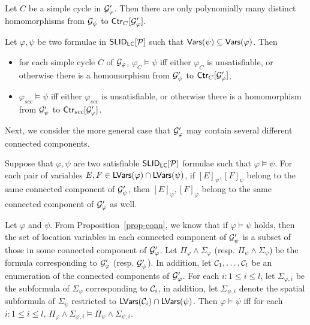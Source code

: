 \documentclass{llncs}
\begin{document}
\begin{proposition}
Let $C$ be a simple cycle in $\mathcal{G}'_\varphi$. Then there are only polynomially many distinct homomorphisms from $\mathcal{G}_\psi$ to ${\sf Ctr}_C[\mathcal{G}'_\varphi]$.
\end{proposition}


\vspace{-4mm}
\begin{lemma}\label{lem-hom}
Let $\varphi,\psi$ be two formulae in ${\sf SLID_{LC} }[\mathcal{P}]$ such that $\mathsf{Vars}(\psi) \subseteq \mathsf{Vars}(\varphi)$. Then
\vspace{-1mm}
\begin{itemize}
\item for each simple cycle $C$ of $\mathcal{G}_\varphi$, $\varphi_C \models \psi$ iff either $\varphi_C$ is unsatisfiable, or otherwise there is a homomorphism from $\mathcal{G}'_\psi$ to $ {\sf Ctr}_C[\mathcal{G}'_\varphi]$,
\item $\varphi_{scc} \models \psi$ iff either $\varphi_{scc}$ is unsatisfiable, or otherwise there is a homomorphism from $\mathcal{G}'_\psi$ to ${\sf Ctr}_{scc}[\mathcal{G}'_\varphi]$.
\end{itemize}
\end{lemma}
\vspace{-2mm}

Next, we consider the more general case that $\mathcal{G}'_\varphi$ may contain several different connected components.

\vspace{-1mm}
\begin{proposition}\label{prop-conn}
Suppose that $\varphi, \psi$ are two satisfiable ${\sf SLID_{LC} }[\mathcal{P}]$ formulae such that $\varphi  \models \psi$. For each pair of variables $E, F \in \mathsf{LVars}(\varphi) \cap \mathsf{LVars}(\psi)$, if $[E]_\psi, [F]_\psi$ belong to the same connected component of $\mathcal{G}'_\psi$, then $[E]_\varphi, [F]_\varphi$ belong to the same connected component of $\mathcal{G}'_\varphi$ as well.
\end{proposition}
\vspace{-1mm}


Let $\varphi$ and $\psi$. From Proposition~\ref{prop-conn}, we know that if $\varphi  \models \psi$ holds, then the set of location variables in each connected component of $\mathcal{G}'_\psi$ is a subset of those in some connected component of $\mathcal{G}'_\varphi$. Let $ \Pi_\varphi \wedge \Sigma_\varphi$ (resp. $ \Pi_\psi \wedge \Sigma_\psi$) be the formula corresponding to $\mathcal{G}'_\varphi$ (resp. $\mathcal{G}'_\psi$). In addition, let $\mathcal{C}_1,\dots, \mathcal{C}_l$ be  an enumeration of the connected components of $\mathcal{G}'_\varphi$. For each $i: 1 \le i \le l$, let $\Sigma_{\varphi, i}$ be the subformula of $\Sigma_\varphi$ corresponding to $\mathcal{C}_i$, in addition, let $\Sigma_{\psi, i}$ denote the spatial subformula of $\Sigma_\psi$ restricted to $\mathsf{LVars}(\mathcal{C}_i) \cap \mathsf{LVars}(\psi)$.  Then $\varphi \models \psi$ iff for each $i: 1 \le i \le l$, $\Pi_\varphi \wedge \Sigma_{\varphi, i} \vDash \Pi_\psi \wedge \Sigma_{\psi, i}$.
\end{document}
